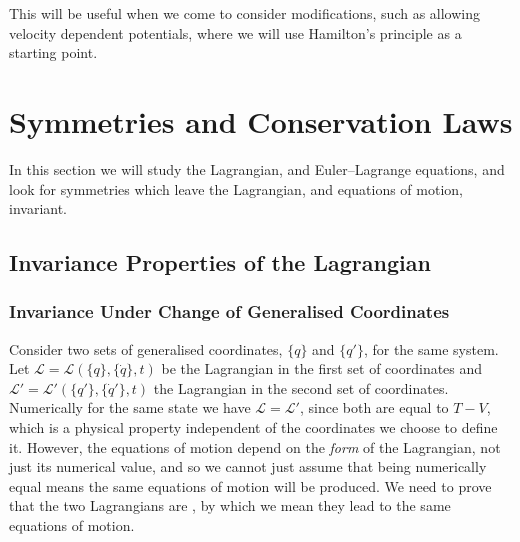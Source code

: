 \documentclass[fleqn]{NotesClass}
\newcommand*{\lagrangian}{\mathcal{L}}
\begin{document}
    This will be useful when we come to consider modifications, such as allowing velocity dependent potentials, where we will use Hamilton's principle as a starting point.
    
    \chapter{Symmetries and Conservation Laws}
    In this section we will study the Lagrangian, and Euler--Lagrange equations, and look for symmetries which leave the Lagrangian, and equations of motion, invariant.
    
    \section{Invariance Properties of the Lagrangian}
    \subsection{Invariance Under Change of Generalised Coordinates}
    Consider two sets of generalised coordinates, \(\{q\}\) and \(\{q'\}\), for the same system.
    Let \(\lagrangian = \lagrangian(\{q\}, \{\dot{q}\}, t)\) be the Lagrangian in the first set of coordinates and \(\lagrangian' = \lagrangian'(\{q'\}, \{\dot{q}'\}, t)\) the Lagrangian in the second set of coordinates.
    Numerically for the same state we have \(\lagrangian = \lagrangian'\), since both are equal to \(T - V\), which is a physical property independent of the coordinates we choose to define it.
    However, the equations of motion depend on the \emph{form} of the Lagrangian, not just its numerical value, and so we cannot just assume that being numerically equal means the same equations of motion will be produced.
    We need to prove that the two Lagrangians are , by which we mean they lead to the same equations of motion.
    
\end{document}
